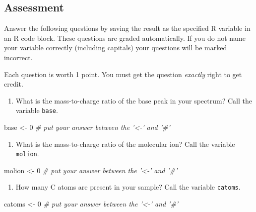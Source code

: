 \documentclass[]{tufte-book}
\newenvironment{Shaded}{}{}
\newcommand{\CommentTok}[1]{\textcolor[rgb]{0.38,0.63,0.69}{\textit{#1}}}
\newcommand{\DecValTok}[1]{\textcolor[rgb]{0.25,0.63,0.44}{#1}}
\newcommand{\NormalTok}[1]{#1}
\newcommand{\StringTok}[1]{\textcolor[rgb]{0.25,0.44,0.63}{#1}}
\providecommand{\tightlist}{%
  \setlength{\itemsep}{0pt}\setlength{\parskip}{0pt}}
\begin{document}
\hypertarget{vape-gc-assessment}{%
\subsection{Assessment}\label{vape-gc-assessment}}

Answer the following questions by saving the result as the specified R variable in an R code block. These questions are graded automatically. If you do not name your variable correctly (including capitals) your questions will be marked incorrect.

Each question is worth 1 point. You must get the question \emph{exactly} right to get credit.

\begin{enumerate}
\def\labelenumi{\arabic{enumi}.}
\tightlist
\item
  What is the mass-to-charge ratio of the base peak in your spectrum? Call the variable \texttt{base}.
\end{enumerate}

\begin{Shaded}
\begin{Highlighting}[]
\NormalTok{base <-}\StringTok{ }\DecValTok{0}     \CommentTok{# put your answer between the '<-' and '#'}
\end{Highlighting}
\end{Shaded}

\begin{enumerate}
\def\labelenumi{\arabic{enumi}.}
\setcounter{enumi}{1}
\tightlist
\item
  What is the mass-to-charge ratio of the molecular ion? Call the variable \texttt{molion}.
\end{enumerate}

\begin{Shaded}
\begin{Highlighting}[]
\NormalTok{molion <-}\StringTok{ }\DecValTok{0}     \CommentTok{# put your answer between the '<-' and '#'}
\end{Highlighting}
\end{Shaded}

\begin{enumerate}
\def\labelenumi{\arabic{enumi}.}
\setcounter{enumi}{2}
\tightlist
\item
  How many C atoms are present in your sample? Call the variable \texttt{catoms}.
\end{enumerate}

\begin{Shaded}
\begin{Highlighting}[]
\NormalTok{catoms <-}\StringTok{ }\DecValTok{0}     \CommentTok{# put your answer between the '<-' and '#'}
\end{Highlighting}
\end{Shaded}
\end{document}
